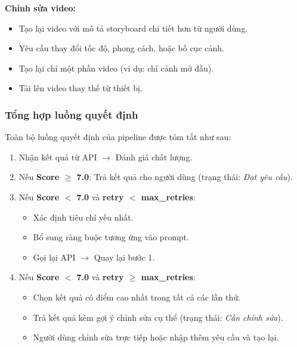\textbf{Chỉnh sửa video:}
\begin{itemize}
    \item Tạo lại video với mô tả storyboard chi tiết hơn từ người dùng.
    \item Yêu cầu thay đổi tốc độ, phong cách, hoặc bố cục cảnh.
    \item Tạo lại chỉ một phần video (ví dụ: chỉ cảnh mở đầu).
    \item Tải lên video thay thế từ thiết bị.
\end{itemize}

\subsubsection{Tổng hợp luồng quyết định}

Toàn bộ luồng quyết định của pipeline được tóm tắt như sau:

\begin{enumerate}
    \item Nhận kết quả từ API $\rightarrow$ Đánh giá chất lượng.
    \item Nếu \textbf{Score $\geq$ 7.0}: Trả kết quả cho người dùng (trạng thái: \textit{Đạt yêu cầu}).
    \item Nếu \textbf{Score $<$ 7.0} và \textbf{retry $<$ max\_retries}:
    \begin{itemize}
        \item Xác định tiêu chí yếu nhất.
        \item Bổ sung ràng buộc tương ứng vào prompt.
        \item Gọi lại API $\rightarrow$ Quay lại bước 1.
    \end{itemize}
    \item Nếu \textbf{Score $<$ 7.0} và \textbf{retry $\geq$ max\_retries}:
    \begin{itemize}
        \item Chọn kết quả có điểm cao nhất trong tất cả các lần thử.
        \item Trả kết quả kèm gợi ý chỉnh sửa cụ thể (trạng thái: \textit{Cần chỉnh sửa}).
        \item Người dùng chỉnh sửa trực tiếp hoặc nhập thêm yêu cầu và tạo lại.
    \end{itemize}
\end{enumerate}

